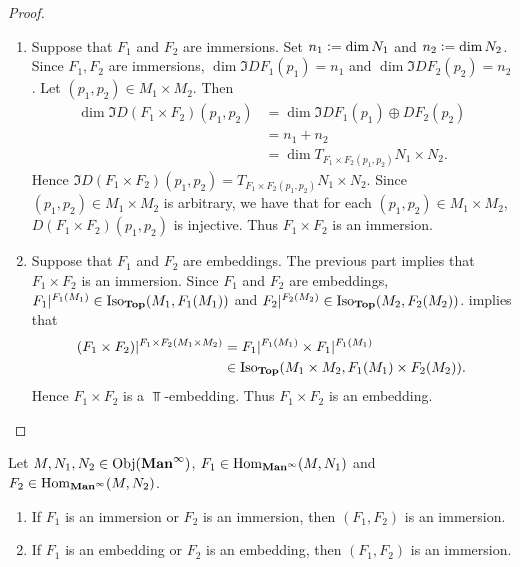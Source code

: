 \documentclass{book}
\begin{document}
\begin{proof}\
	\begin{enumerate}
		\item Suppose that $F_1$ and $F_2$ are immersions. Set $n_1 \vcentcolon= \dim N_1$ and $n_2 \vcentcolon= \dim N_2$. Since $F_1, F_2$ are immersions, $\dim \Im DF_1(p_1) = n_1$ and $\dim \Im DF_2(p_2) = n_2$. Let $(p_1, p_2) \in M_1 \times M_2$. Then 
		\begin{align*}
			\dim \Im D(F_1 \times F_2)(p_1, p_2)
			& = \dim \Im DF_1(p_1) \oplus DF_2(p_2) \\
			& = n_1 + n_2 \\
			& = \dim T_{F_1 \times F_2(p_1, p_2)} N_1 \times N_2.
		\end{align*} 
		Hence $\Im D(F_1 \times F_2)(p_1, p_2) = T_{F_1 \times F_2(p_1, p_2)} N_1 \times N_2$. Since $(p_1, p_2) \in M_1 \times M_2$ is arbitrary, we have that for each $(p_1, p_2) \in M_1 \times M_2$, $D(F_1 \times F_2)(p_1, p_2)$ is injective. Thus $F_1 \times F_2$ is an immersion.
		\item Suppose that $F_1$ and $F_2$ are embeddings. The previous part implies that $F_1 \times F_2$ is an immersion. Since $F_1$ and $F_2$ are embeddings, $F_1|^{F_1(M_1)} \in \operatorname{Iso}_{\operatorname*{\text{\textbf{Top}}}}(M_1, F_1(M_1))$ and $F_2|^{F_2(M_2)} \in \operatorname{Iso}_{\operatorname*{\text{\textbf{Top}}}}(M_2, F_2(M_2))$. \rex{}  implies that 
		\begin{align*}
			(F_1 \times F_2)|^{F_1 \times F_2(M_1 \times M_2)} 
			& = F_1|^{F_1(M_1)} \times F_1|^{F_1(M_1)} \\
			& \in \operatorname{Iso}_{\operatorname*{\text{\textbf{Top}}}}( M_1 \times M_2, F_1(M_1) \times F_2(M_2)).
		\end{align*}
		Hence $F_1 \times F_2$ is a $\Top$-embedding. Thus $F_1 \times F_2$ is an embedding.
	\end{enumerate}
\end{proof}

\begin{ex} 
	Let $M, N_1, N_2 \in \operatorname{Obj}(\operatorname*{\text{\textbf{Man}}^{\infty}})$, $F_1 \in \operatorname{Hom}_{\operatorname*{\text{\textbf{Man}}^{\infty}}}(M, N_1)$ and $F_2 \in \operatorname{Hom}_{\operatorname*{\text{\textbf{Man}}^{\infty}}}(M, N_2)$. 
	\begin{enumerate}
		\item If $F_1$ is an immersion or $F_2$ is an immersion, then $(F_1, F_2)$ is an immersion. 
		\item If $F_1$ is an embedding or $F_2$ is an embedding, then $(F_1, F_2)$ is an immersion. 
	\end{enumerate}
\end{ex}
\end{document}
